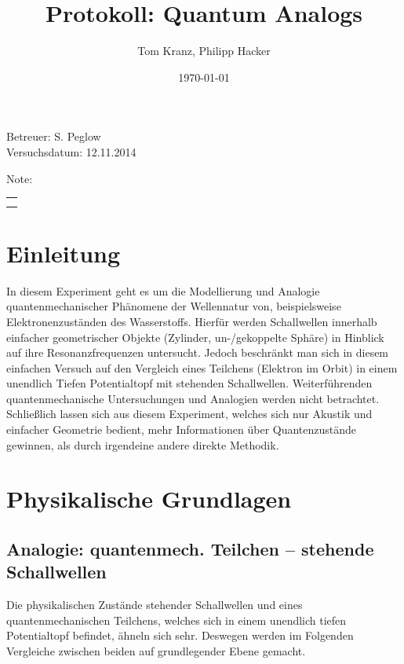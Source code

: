 \documentclass[numbers=noenddot,12pt,a4paper]{scrartcl}
\title{Protokoll: Quantum Analogs} %
\author{Tom Kranz, Philipp Hacker}
\date{\today}
\begin{document}
\maketitle
\begin{center}
Betreuer: S. Peglow \\ %
Versuchsdatum: 12.11.2014 \\ %
\begin{table}[h]
\centering
Note: %
\begin{tabularx}{1.5cm}{|X|}
\hline \\ \\
\hline
\end{tabularx}
\end{table}
\end{center}
\vspace*{\fill}
\tableofcontents
\vfill
\newpage
\section{Einleitung}
In diesem Experiment geht es um die Modellierung und Analogie quantenmechanischer Phänomene der Wellennatur von, beispielsweise Elektronenzuständen des Wasserstoffs. Hierfür werden Schallwellen innerhalb einfacher geometrischer Objekte (Zylinder, un-/gekoppelte Sphäre) in Hinblick auf ihre Resonanzfrequenzen untersucht. Jedoch beschränkt man sich in diesem einfachen Versuch auf den Vergleich eines Teilchens (Elektron im Orbit) in einem unendlich Tiefen Potentialtopf mit stehenden Schallwellen. Weiterführenden quantenmechanische Untersuchungen und Analogien werden nicht betrachtet. Schließlich lassen sich aus diesem Experiment, welches sich nur Akustik und einfacher Geometrie bedient, mehr Informationen über Quantenzustände gewinnen, als durch irgendeine andere direkte Methodik.
\fancyfoot[L]{\textit{}}
\newpage
\fancyfoot[L]{}
\section{Physikalische Grundlagen}
\subsection{Analogie: quantenmech. Teilchen -- stehende Schallwellen}
Die physikalischen Zustände stehender Schallwellen und eines quantenmechanischen Teilchens, welches sich in einem unendlich tiefen Potentialtopf befindet, ähneln sich sehr. Deswegen werden im Folgenden Vergleiche zwischen beiden auf grundlegender Ebene gemacht.
\end{document}
